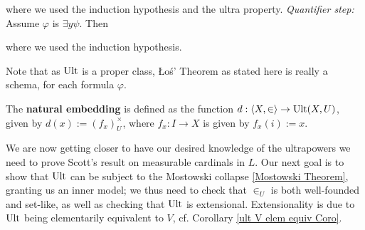 {where we used the induction hypothesis and the ultra property. \textit{Quantifier step:} Assume $\varphi$ is $\exists y\psi$. Then

where we used the induction hypothesis.
}

Note that as $\operatorname{Ult}$ is a proper class, \L o\' s' Theorem as stated here is really a schema, for each formula $\varphi$.


The \textbf{natural embedding} is defined as the function $d:\langle X,\in\rangle\to\operatorname{Ult}(X,U)$, given by $d(x):=(f_x)_U^\times$, where $f_x:I\to X$ is given by $f_x(i):=x$.

\pagebreak


We are now getting closer to have our desired knowledge of the ultrapowers we need to prove Scott's result on measurable cardinals in $L$. Our next goal is to show that $\operatorname{Ult}$ can be subject to the Mostowski collapse \ref{Mostowski Theorem}, granting us an inner model; we thus need to check that $\in_U$ is both well-founded and set-like, as well as checking that $\operatorname{Ult}$ is extensional. Extensionality is due to $\operatorname{Ult}$ being elementarily equivalent to $V$, cf. Corollary \ref{ult V elem equiv Coro}.

